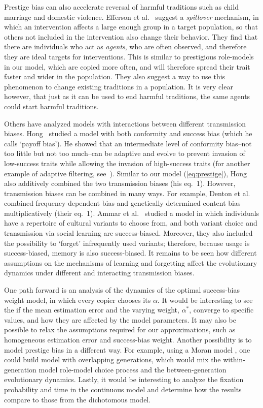 \documentclass[12pt]{extarticle}
\begin{document}
Prestige bias can also accelerate reversal of harmful traditions such as child marriage and domestic violence. 
Efferson et al.~\citep{harmful_traditions} suggest a \emph{spillover} mechanism, in which an intervention affects a large enough group in a target population, so that others not included in the intervention also change their behavior.
They find that there are individuals who act as \emph{agents}, who are often observed, and therefore they are ideal targets for interventions. This is similar to prestigious role-models in our model, which are copied more often, and will therefore spread their trait faster and wider in the population.
They also suggest a way to use this phenomenon to change existing traditions in a population.
It is very clear however, that just as it can be used to end harmful traditions, the same agents could start harmful traditions.

Others have analyzed models with interactions between different transmission biases.
Hong~\citep{payoff} studied a model with both conformity and success bias (which he calls `payoff bias'). 
He showed that an intermediate level of conformity bias--not too little but not too much--can be adaptive and evolve to prevent invasion of low-success traits while allowing the invasion of high-success traits (for another example of adaptive filtering, see~\citep{adaptive_filtering}).
Similar to our model (\cref{eq:prestige}), Hong~\citep{payoff} also additively combined the two transmission biases (his eq.~1). However, transmission biases can be combined in many ways. 
For example, Denton et al.~\citep{Denton2022} combined frequency-dependent bias and genetically determined content bias multiplicatively (their eq.~1). 
Ammar et al.~\citep{Ammar2023} studied a model in which individuals have a repertoire of cultural variants to choose from, and both variant choice and transmission via social learning are success-biased. Moreover, they also included the possibility to `forget' infrequently used variants; therefore, because usage is success-biased, memory is also success-biased. It remains to be seen how different assumptions on the mechanisms of learning and forgetting affect the evolutionary dynamics under different and interacting transmission biases.

One path forward is an analysis of the dynamics of the optimal success-bias weight model, in which every copier chooses its $\alpha$. It would be interesting to see the if the mean estimation error and the varying weight, $\alpha^*$, converge to specific values, and how they are affected by the model parameters.
It may also be possible to relax the assumptions required for our approximations, such as homogeneous estimation error and success-bias weight.
Another possibility is to model prestige bias in a different way. For example, using a Moran model \citep{Moran1958}, one could build model with overlapping generations, which would mix the within-generation model role-model choice process and the between-generation evolutionary dynamics.
Lastly, it would be interesting to analyze the fixation probability and time in the continuous model and determine how the results compare to those from the dichotomous model. 
\end{document}
